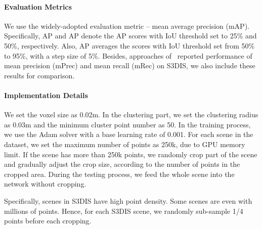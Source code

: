\documentclass[10pt,twocolumn,letterpaper]{article}
\begin{document}
\vspace*{-3mm}
\paragraph{Evaluation Metrics}
We use the widely-adopted evaluation metric -- mean average precision (mAP). Specifically, AP and AP denote the AP scores with IoU threshold set to 25\% and 50\%, respectively. Also, AP averages the scores with IoU threshold set from 50\% to 95\%, with a step size of 5\%. Besides, approaches of~\cite{wang2019associatively,yang2019learning} reported performance of mean precision (mPrec) and mean recall (mRec) on S3DIS, we also include these results for comparison.

\vspace*{-3mm}
\paragraph{Implementation Details}
We set the voxel size as 0.02m. 
In the clustering part, we set the clustering radius  as 0.03m and the minimum cluster point number  as 50. 
In the training process, we use the Adam solver with a base learning rate of 0.001. For each scene in the dataset, we set the maximum number of points as 250k, due to GPU memory limit. If the scene has more than 250k points, we randomly crop part of the scene and gradually adjust the crop size, according to the number of points in the cropped area. During the testing process, we feed the whole scene into the network without cropping.

Specifically, scenes in S3DIS have high point density. Some scenes are even with millions of points. Hence, for each S3DIS scene, we randomly sub-sample 1/4 points before each cropping. 
\end{document}
